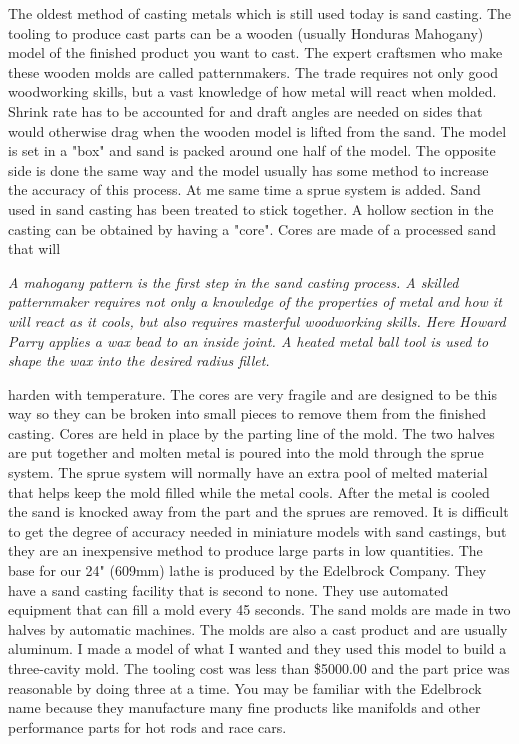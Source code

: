 
The oldest method of casting metals which is still used today is sand casting.
The tooling to produce cast parts can be a wooden (usually Honduras Mahogany)
model of the finished product you want to cast. The expert craftsmen who make
these wooden molds are called patternmakers. The trade requires not only good
woodworking skills, but a vast knowledge of how metal will react when molded.
Shrink rate has to be accounted for and draft angles are needed on sides that
would otherwise drag when the wooden model is lifted from the sand. The model is
set in a "box" and sand is packed around one half of the model. The opposite
side is done the same way and the model usually has some method to increase the
accuracy of this process. At me same time a sprue system is added. Sand used in
sand casting has been treated to stick together. A hollow section in the casting
can be obtained by having a "core". Cores are made of a processed sand that will

\bigskip
\textit{A mahogany pattern is the first step in the sand casting process. A
skilled patternmaker requires not only a knowledge of the properties of metal
and how it will react as it cools, but also requires masterful woodworking
skills. Here Howard Parry applies a wax bead to an inside joint. A heated metal
ball tool is used to shape the wax into the desired radius fillet.}
\bigskip

harden with temperature. The cores are very fragile and are designed to be this
way so they can be broken into small pieces to remove them from the finished
casting. Cores are held in place by the parting line of the mold. The two halves
are put together and molten metal is poured into the mold through the sprue
system. The sprue system will normally have an extra pool of melted material
that helps keep the mold filled while the metal cools. After the metal is cooled
the sand is knocked away from the part and the sprues are removed. It is
difficult to get the degree of accuracy needed in miniature models with sand
castings, but they are an inexpensive method to produce large parts in low
quantities. The base for our 24" (609mm) lathe is produced by the Edelbrock
Company. They have a sand casting facility that is second to none. They use
automated equipment that can fill a mold every 45 seconds. The sand molds are
made in two halves by automatic machines. The molds are also a cast product and
are usually aluminum. I made a model of what I wanted and they used this model
to build a three-cavity mold. The tooling cost was less than \$5000.00 and the
part price was reasonable by doing three at a time. You may be familiar with the
Edelbrock name because they manufacture many fine products like manifolds and
other performance parts for hot rods and race cars.


